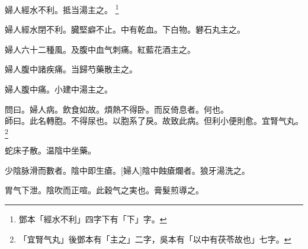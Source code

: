 \documentclass[12pt,oneside,UTF8,b5paper]{ctexbook}她她她她她她她
\begin{document}
婦人經水不利。抵当湯主之。
	\footnote{鄧本「經水不利」四字下有「下」字。}

婦人經水閉不利。臓堅癖不止。中有乾血。下白物。礬石丸主之。

婦人六十二種風。及腹中血气刺痛。紅藍花酒主之。

婦人腹中諸疾痛。当歸芍藥散主之。

婦人腹中痛。小建中湯主之。

問曰。婦人病。飲食如故。煩熱不得卧。而反倚息者。何也。\\
師曰。此名轉胞。不得尿也。以胞系了戾。故致此病。但利小便則愈。宜腎气丸。
	\footnote{「宜腎气丸」後鄧本有「主之」二字，吳本有「以中有茯苓故也」七字。}

蛇床子散。温陰中坐藥。

少陰脉滑而數者。陰中即生瘡。[婦人]陰中蝕瘡爛者。狼牙湯洗之。

胃气下泄。陰吹而正喧。此穀气之実也。膏髮煎導之。
\end{document}

